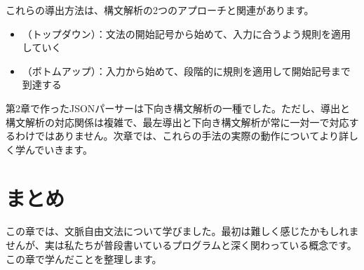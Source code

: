 これらの導出方法は、構文解析の2つのアプローチと関連があります。

\begin{itemize}
\item
  （トップダウン）：文法の開始記号から始めて、入力に合うよう規則を適用していく
\item
  （ボトムアップ）：入力から始めて、段階的に規則を適用して開始記号まで到達する
\end{itemize}

第2章で作ったJSONパーサーは下向き構文解析の一種でした。ただし、導出と構文解析の対応関係は複雑で、最左導出と下向き構文解析が常に一対一で対応するわけではありません。次章では、これらの手法の実際の動作についてより詳しく学んでいきます。

\section{まとめ}

この章では、文脈自由文法について学びました。最初は難しく感じたかもしれませんが、実は私たちが普段書いているプログラムと深く関わっている概念です。この章で学んだことを整理します。

